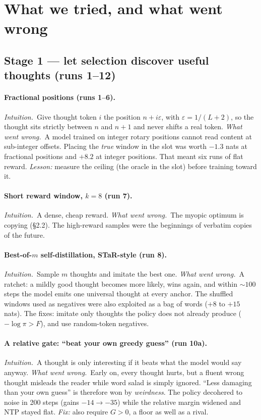 \documentclass[11pt]{article}
\newcommand{\why}{\emph{Intuition.}\ }
\newcommand{\fail}{\emph{What went wrong.}\ }
\begin{document}
\section{What we tried, and what went wrong}

\subsection*{Stage 1 --- let selection discover useful thoughts (runs 1--12)}

\paragraph{Fractional positions (runs 1--6).}
\why Give thought token $i$ the position $n+i\varepsilon$, with $\varepsilon=1/(L+2)$, so the thought sits strictly between $n$ and $n+1$ and never shifts a real token.
\fail A model trained on integer rotary positions cannot read content at sub-integer offsets. Placing the \emph{true} window in the slot was worth $-1.3$ nats at fractional positions and $+8.2$ at integer positions. That meant six runs of flat reward. \emph{Lesson:} measure the ceiling (the oracle in the slot) before training toward it.

\paragraph{Short reward window, $k=8$ (run 7).}
\why A dense, cheap reward.
\fail The myopic optimum is copying (\S2.2). The high-reward samples were the beginnings of verbatim copies of the future.

\paragraph{Best-of-$m$ self-distillation, STaR-style (run 8).}
\why Sample $m$ thoughts and imitate the best one.
\fail A ratchet: a mildly good thought becomes more likely, wins again, and within ${\sim}100$ steps the model emits one universal thought at every anchor. The shuffled windows used as negatives were also exploited as a bag of words ($+8$ to $+15$ nats). The fixes: imitate only thoughts the policy does not already produce ($-\log\pi>F$), and use random-token negatives.

\paragraph{A relative gate: ``beat your own greedy guess'' (run 10a).}
\why A thought is only interesting if it beats what the model would say anyway.
\fail Early on, every thought hurts, but a fluent wrong thought misleads the reader while word salad is simply ignored. ``Less damaging than your own guess'' is therefore won by \emph{weirdness}. The policy decohered to noise in 200 steps (gains $-14\to-35$) while the relative margin widened and NTP stayed flat. \emph{Fix:} also require $G>0$, a floor as well as a rival.
\end{document}
